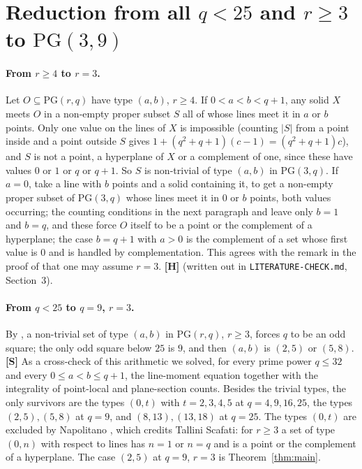 \documentclass[11pt]{article}
\theoremstyle{plain}
\theoremstyle{remark}
\newcommand{\PG}{\mathrm{PG}}
\newcommand{\file}[1]{\texttt{#1}}
\begin{document}
\section{Reduction from all $q<25$ and $r\ge3$ to $\PG(3,9)$}\label{sec:reduce}

\paragraph{From $r\ge 4$ to $r=3$.}
Let $O\subseteq\PG(r,q)$ have type $(a,b)$, $r\ge4$.
If $0<a<b<q+1$, any solid $X$ meets $O$ in a non-empty proper subset $S$ all of whose lines meet it in $a$ or $b$ points.
Only one value on the lines of $X$ is impossible (counting $|S|$ from a point inside and a point outside $S$ gives $1+(q^2+q+1)(c-1)=(q^2+q+1)c$), and $S$ is not a point, a hyperplane of $X$ or a complement of one, since these have values $0$ or $1$ or $q$ or $q+1$.
So $S$ is non-trivial of type $(a,b)$ in $\PG(3,q)$.
If $a=0$, take a line with $b$ points and a solid containing it, to get a non-empty proper subset of $\PG(3,q)$ whose lines meet it in $0$ or $b$ points, both values occurring; the counting conditions in the next paragraph and \cite{Nap} leave only $b=1$ and $b=q$, and these force $O$ itself to be a point or the complement of a hyperplane; the case $b=q+1$ with $a>0$ is the complement of a set whose first value is $0$ and is handled by complementation.
This agrees with the remark in the proof of \cite[Theorem 12.5]{CK} that one may assume $r=3$.
\textbf{[H]} (written out in \file{LITERATURE-CHECK.md}, Section~3).

\paragraph{From $q<25$ to $q=9$, $r=3$.}
By \cite[Theorem 12.5]{CK}, a non-trivial set of type $(a,b)$ in $\PG(r,q)$, $r\ge3$, forces $q$ to be an odd square; the only odd square below $25$ is $9$, and then $(a,b)$ is $(2,5)$ or $(5,8)$.
\textbf{[S]} As a cross-check of this arithmetic we solved, for every prime power $q\le32$ and every $0\le a<b\le q+1$, the line-moment equation together with the integrality of point-local and plane-section counts.
Besides the trivial types, the only survivors are the types $(0,t)$ with $t=2,3,4,5$ at $q=4,9,16,25$, the types $(2,5),(5,8)$ at $q=9$, and $(8,13),(13,18)$ at $q=25$.
The types $(0,t)$ are excluded by Napolitano \cite[Corollary 4.4]{Nap}, which credits Tallini Scafati: for $r\ge3$ a set of type $(0,n)$ with respect to lines has $n=1$ or $n=q$ and is a point or the complement of a hyperplane.
The case $(2,5)$ at $q=9$, $r=3$ is Theorem~\ref{thm:main}.
\end{document}
